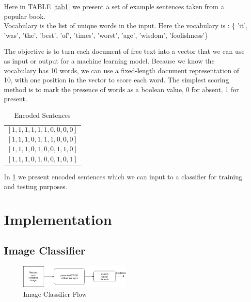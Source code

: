 \documentclass[conference]{IEEEtran}
\begin{document}
Here in TABLE \ref{tab1} we present a set of example sentences taken from a popular book.\\
Vocabulary is the list of unique words in the input. Here the vocabulary is : \{ 'it', 'was', 'the', 'best', 'of', 'times', 'worst', 'age', 'wisdom', 'foolishness'\}

The objective is to turn each document of free text into a vector that we can use as input or output for a machine learning model.
Because we know the vocabulary has 10 words, we can use a fixed-length document representation of 10, with one position in the vector to score each word.
The simplest scoring method is to mark the presence of words as a boolean value, 0 for absent, 1 for present. 

\begin{table}[hbtp]
\caption{Encoded Sentences}

\begin{center}

\begin{tabular}{|c|}

\hline
$$ [ 1, 1, 1, 1, 1, 1, 0, 0, 0, 0 ] $$ \\
$$ [ 1, 1, 1, 0, 1, 1, 1, 0, 0, 0 ] $$ \\
$$ [ 1, 1, 1, 0, 1, 0, 0, 1, 1, 0 ] $$\\
$$ [ 1, 1, 1, 0, 1, 0, 0, 1, 0, 1 ] $$\\
\hline

\end{tabular}

\label{tab2}
\end{center}

\end{table}

In \ref{tab2} we present encoded sentences which we can input to a classifier for training and testing purposes.

\section{Implementation}

\subsection{Image Classifier}

\begin{figure}[htbp]
\centerline{\includegraphics[width=0.5\textwidth]{pics/block_images/image.png}}
\caption{ Image Classifier Flow }
\label{fig:imageflow}
\end{figure}%
\end{document}
